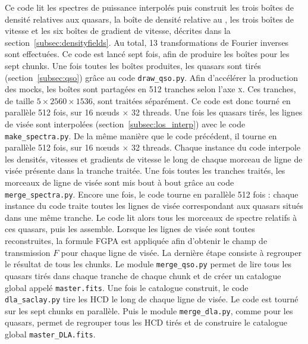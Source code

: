 Ce code lit les spectres de puissance interpolés puis construit les trois boîtes de densité relatives aux quasars, la boîte de densité relative au \lya{}, les trois boîtes de vitesse et les six boîtes de gradient de vitesse, décrites dans la section~\ref{subsec:densityfields}.
Au total, \num{13} transformations de Fourier inverses sont effectuées.
Ce code est lancé sept fois, afin de produire les boîtes pour les sept chunks.
Une fois toutes les boîtes produites, les quasars sont tirés (section~\ref{subsec:qso}) grâce au code \texttt{draw\_qso.py}. Afin d'accélérer la production des mocks, les boîtes sont partagées en \num{512} tranches selon l'axe \textsc{x}. Ces tranches, de taille $\num{5}\times\num{2560}\times\num{1536}$, sont traitées séparément. Ce code est donc tourné en parallèle \num{512} fois, sur 16 nœuds $\times$ 32 threads.
Une fois les quasars tirés, les lignes de visée sont interpolées (section~\ref{subsec:los_interp}) avec le code \texttt{make\_spectra.py}. De la même manière que le code précédent, il tourne en parallèle \num{512} fois, sur 16 nœuds $\times$ 32 threads.
Chaque instance du code interpole les densités, vitesses et gradients de vitesse le long de chaque morceau de ligne de visée présente dans la tranche traitée.
Une fois toutes les tranches traités, les morceaux de ligne de visée sont mis bout à bout grâce au code \texttt{merge\_spectra.py}.
Encore une fois, le code tourne en parallèle \num{512} fois : chaque instance du code traite toutes les lignes de visée correspondant aux quasars situés dans une même tranche. Le code lit alors tous les morceaux de spectre relatifs à ces quasars, puis les assemble.
Lorsque les lignes de visée sont toutes reconstruites, la formule FGPA est appliquée afin d'obtenir le champ de transmission $F$ pour chaque ligne de visée.
La dernière étape consiste à regrouper le résultat de tous les chunks. Le module \texttt{merge\_qso.py} permet de lire tous les quasars tirés dans chaque tranche de chaque chunk et de créer un catalogue global appelé \texttt{master.fits}. Une fois le catalogue construit, le code \texttt{dla\_saclay.py} tire les HCD le long de chaque ligne de visée. Le code est tourné sur les sept chunks en parallèle. Puis le module \texttt{merge\_dla.py}, comme pour les quasars, permet de regrouper tous les HCD tirés et de construire le catalogue global \texttt{master\_DLA.fits}.
